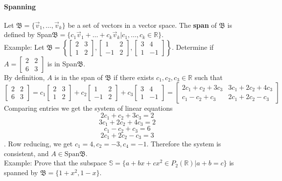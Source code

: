 \documentclass[10pt,letter]{article}
\begin{document}
\paragraph{Spanning} Let $\mathfrak{B}=\{\vec{v}_1,\ldots,\vec{v}_k\}$ be a set of vectors in a vector space. The \textbf{span} of $\mathfrak{B}$ is defined by Span$\mathfrak{B}=\{c_1\vec{v}_1+\ldots+c_k\vec{v}_k|c_1,\ldots,c_k\in\mathbb{R}\}$. \\ 
Example: Let $\mathfrak{B}=\left\{\begin{bmatrix}2&3\\1&2\end{bmatrix},\begin{bmatrix}1&2\\-1&2\end{bmatrix},\begin{bmatrix}3&4\\1&-1\end{bmatrix}\right\}$. Determine if $A=\begin{bmatrix}2&2\\6&3\end{bmatrix}$ is in Span$\mathfrak{B}$. \\ 
By definition, $A$ is in the span of $\mathfrak{B}$ if there exists $c_1,c_2,c_3\in\mathbb{R}$ such that $$\begin{bmatrix}2&2\\6&3\end{bmatrix}=c_1\begin{bmatrix}2&3\\1&2\end{bmatrix}+c_2\begin{bmatrix}1&2\\-1&2\end{bmatrix}+c_3\begin{bmatrix}3&4\\1&-1\end{bmatrix}=\begin{bmatrix}2c_1+c_2+3c_3&3c_1+2c_2+4c_3\\c_1-c_2+c_3&2c_1+2c_2-c_3\end{bmatrix}$$ Comparing entries we get the system of linear equations $$2c_1+c_2+3c_3=2$$ $$3c_1+2c_2+4c_3=2$$ $$c_1-c_2+c_3=6$$ $$2c_1+2c_2-c_3=3$$. Row reducing, we get $c_1=4,c_2=-3,c_4=-1$. Therefore the system is consistent, and $A\in\text{Span}\mathfrak{B}$. \\
Example: Prove that the subspace $\mathbb{S}=\{a+bx+cx^2\in P_2(\mathbb{R})|a+b=c\}$ is spanned by $\mathfrak{B}=\{1+x^2,1-x\}$. \\ 
\end{document}
